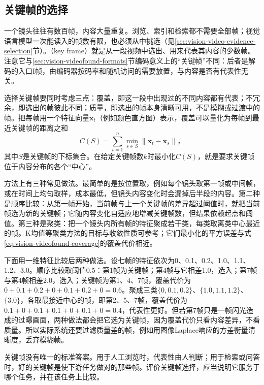 \subsection{关键帧的选择}
\label{sec:vision-videofound-keyframes}

一个镜头往往有数百帧，内容大量重复。浏览、索引和检索都不需要全部帧；视觉语言模型一次能读入的帧数有限，也必须从中挑选（见\ref{sec:vision-video-evidence-selection}节）。（key frame）就是从一段视频中选出、用来代表其内容的少数帧。注意它与\ref{sec:vision-videofound-formats}节编码意义上的“关键帧”不同：后者是解码的入口I帧，由编码器按码率和随机访问的需要放置，与内容是否有代表性无关。

选择关键帧要同时考虑三点：覆盖，即这一段中出现过的不同内容都有代表；不冗余，即选出的帧彼此不同；质量，即选出的帧本身清晰可用，不是模糊或过渡中的帧。把每帧用一个特征向量$\bm x_t$（例如颜色直方图）表示，覆盖可以量化为每帧到最近关键帧的距离之和
\begin{equation}
  C(S)=\sum_{t=1}^{n}\min_{s\in S}\lVert\bm x_t-\bm x_s\rVert\text{，}
  \label{eq:vision-videofound-coverage}
\end{equation}
其中$S$是关键帧的下标集合。在给定关键帧数$k$时最小化$C(S)$，就是要求关键帧位于内容分布的各个“中心”。

方法上有三种常见做法。最简单的是按位置取，例如每个镜头取第一帧或中间帧，或在时间上均匀取样，成本最低，但镜头内容变化时会漏掉后半段的内容。第二种是顺序比较：从第一帧开始，当前帧与上一个关键帧的差异超过阈值时，就把当前帧选为新的关键帧；它随内容变化自适应地增减关键帧数，但结果依赖起点和阈值。第三种是聚类：把一个镜头内所有帧的特征聚成若干类，每类取离类中心最近的帧。K均值等聚类方法的目标与收敛性质可参考；它们最小化的平方误差与式\eqref{eq:vision-videofound-coverage}的覆盖代价相近。

下面用一维特征比较后两种做法。设七帧的特征依次为0、0.1、0.2、1.0、1.1、1.2、3.0。顺序比较取阈值0.5：第1帧为关键帧；第4帧与它相差1.0，选入；第7帧与第4帧相差2.0，选入；关键帧为第1、4、7帧，覆盖代价为$0+0.1+0.2+0+0.1+0.2+0=0.6$。聚成三类$\{0,0.1,0.2\}$、$\{1.0,1.1,1.2\}$、$\{3.0\}$，各取最接近中心的帧，即第2、5、7帧，覆盖代价为$0.1+0+0.1+0.1+0+0.1+0=0.4$，代表性更好。但若第7帧只是一帧闪光造成的过曝画面，两种做法都会把它选为关键帧，因为覆盖代价只看内容差异，不看质量。所以实际系统还要过滤质量差的帧，例如用图像Laplace响应的方差衡量清晰度，丢弃模糊帧。

关键帧没有唯一的标准答案。用于人工浏览时，代表性由人判断；用于检索或问答时，好的关键帧是使下游任务做对的那些帧。评价关键帧选择，应当说明它服务于哪个任务，并在该任务上比较。

